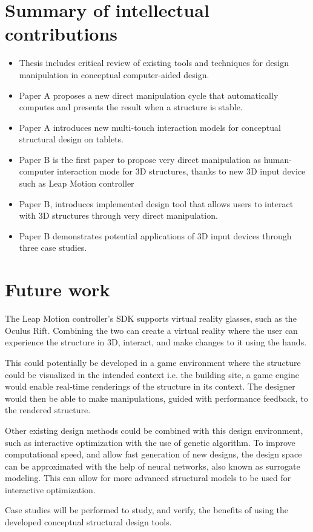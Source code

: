\section{Summary of intellectual contributions}
\begin{itemize} 
\item Thesis includes critical review of existing tools and techniques for design manipulation in conceptual computer-aided design.
\item Paper A proposes a new direct manipulation cycle that automatically computes and presents the result when a structure is stable.
\item Paper A introduces new multi-touch interaction models for conceptual structural design on tablets.
\item Paper B is the first paper to propose very direct manipulation as human-computer interaction mode for 3D structures, thanks to new 3D input device such as Leap Motion controller
\item Paper B, introduces implemented design tool that allows users to interact with 3D structures through very direct manipulation.
\item Paper B demonstrates potential applications of 3D input devices through three case studies.
\end{itemize} 


\section{Future work}
The Leap Motion controller’s SDK supports virtual reality glasses, such as the Oculus Rift. Combining the two can create a virtual reality where the user can experience the structure in 3D, interact, and make changes to it using the hands. 

This could potentially be developed in a game environment where the structure could be visualized in the intended context i.e. the building site, a game engine would enable real-time renderings of the structure in its context. The designer would then be able to make manipulations, guided with performance feedback, to the rendered structure. 

Other existing design methods could be combined with this design environment, such as interactive optimization with the use of genetic algorithm. To improve computational speed, and allow fast generation of new designs, the design space can be approximated with the help of neural networks, also known as surrogate modeling. This can allow for more advanced structural models to be used for interactive optimization.

Case studies will be performed to study, and verify, the benefits of using the developed conceptual structural design tools. 